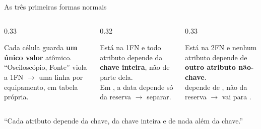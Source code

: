 \documentclass[aspectratio=169,10pt]{beamer}
\begin{document}
\begin{frame}{As três primeiras formas normais}
  \begin{columns}[T]
    \begin{column}{0.33\textwidth}
      \begin{conceito}
        Cada célula guarda \textbf{um único valor} atômico.\\[3pt]
        \textcolor{vermelhoerro}{``Osciloscópio, Fonte''} viola a 1FN $\rightarrow$ uma linha por equipamento, em tabela própria.
      \end{conceito}
    \end{column}
    \begin{column}{0.32\textwidth}
      \begin{conceito}
        Está na 1FN e todo atributo depende da \textbf{chave inteira}, não de parte dela.\\[3pt]
        Em , a data depende só da reserva $\rightarrow$ separar.
      \end{conceito}
    \end{column}
    \begin{column}{0.33\textwidth}
      \begin{conceito}
        Está na 2FN e nenhum atributo depende de \textbf{outro atributo não-chave}.\\[3pt]
         depende de , não da reserva $\rightarrow$ vai para .
      \end{conceito}
    \end{column}
  \end{columns}
  \vspace{4pt}
  \begin{center}
  \end{center}
  \begin{dica}
    ``Cada atributo depende da chave, da chave inteira e de nada além da chave.''
  \end{dica}
\end{frame}
\end{document}
